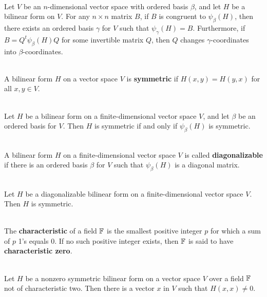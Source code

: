 \begin{corollary}
	\hfill\\
	Let $V$ be an $n$-dimensional vector space with ordered basis $\beta$, and let $H$ be a bilinear form on $V$. For any $n \times n$ matrix $B$, if $B$ is congruent to $\psi_\beta(H)$, then there exists an ordered basis $\gamma$ for $V$ such that $\psi_\gamma(H) = B$. Furthermore, if $B = Q^t\psi_\beta(H)Q$ for some invertible matrix $Q$, then $Q$ changes $\gamma$-coordinates into $\beta$-coordinates.
\end{corollary}

\begin{definition}
	\hfill\\
	A bilinear form $H$ on a vector space $V$ is \textbf{symmetric} if $H(x,y) = H(y,x)$ for all $x,y \in V$.
\end{definition}

\begin{theorem}
	\hfill\\
	Let $H$ be a bilinear form on a finite-dimensional vector space $V$, and let $\beta$ be an ordered basis for $V$. Then $H$ is symmetric if and only if $\psi_\beta(H)$ is symmetric.
\end{theorem}

\begin{definition}
	\hfill\\
	A bilinear form $H$ on a finite-dimensional vector space $V$ is called \textbf{diagonalizable} if there is an ordered basis $\beta$ for $V$ such that $\psi_\beta(H)$ is a diagonal matrix.
\end{definition}

\begin{corollary}
	\hfill\\
	Let $H$ be a diagonalizable bilinear form on a finite-dimensional vector space $V$. Then $H$ is symmetric.
\end{corollary}

\begin{definition}
	\hfill\\
	The \textbf{characteristic} of a field $\mathbb{F}$ is the smallest positive integer $p$ for which a sum of $p$ 1's equals $0$. If no such positive integer exists, then $\mathbb{F}$ is said to have \textbf{characteristic zero}.
\end{definition}

\begin{lemma}
	\hfill\\
	Let $H$ be a nonzero symmetric bilinear form on a vector space $V$ over a field $\mathbb{F}$ not of characteristic two. Then there is a vector $x$ in $V$ such that $H(x,x) \neq 0$.
\end{lemma}

